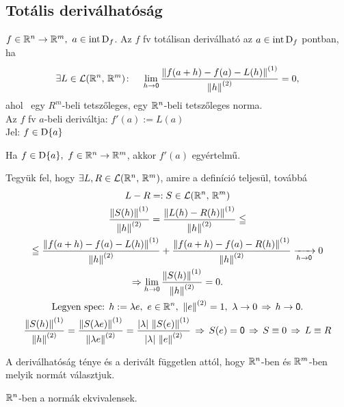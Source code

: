 \subsection{Totális deriválhatóság}

\begin{de}
  $f\in\mathbb{R}^n\to\mathbb{R}^m,\ a\in\operatorname{int\,D}_f$. Az $f$ fv totálisan deriválható az $a\in\operatorname{int\,D}_f$ pontban, ha
  \[\exists L\in\mathcal{L}(\mathbb{R}^n,\,\mathbb{R}^m)\colon\quad \lim_{h\to\mathsf{0}}\dfrac{\left\Vert f(a+h)-f(a)-L(h)\right\Vert^{(1)}}{\left\Vert h\right\Vert^{(2)}} = 0,\]
  ahol \ egy $R^m$-beli tetszőleges,  egy $\mathbb{R}^n$-beli tetszőleges norma.\\
  Az $f$ fv $a$-beli deriváltja: $f'(a) := L(a)$\\
  Jel: $f\in\operatorname{D}\{a\}$
\end{de}

\begin{te}
  Ha $f\in\operatorname{D}\{a\},\ f\in\mathbb{R}^n\to\mathbb{R}^m$, akkor $f'(a)$ egyértelmű.
\end{te}

\begin{biz}
  Tegyük fel, hogy $\exists L,R\in\mathcal{L}(\mathbb{R}^n,\,\mathbb{R}^m)$, amire a definíció teljesül, továbbá 
  \begin{gather*}
     L-R=:S\in\mathcal{L}(\mathbb{R}^n,\,\mathbb{R}^m)\\
     \dfrac{\left\Vert S(h)\right\Vert^{(1)}}{\left\Vert h\right\Vert^{(2)}} = \dfrac{\left\Vert L(h)-R(h)\right\Vert^{(1)}}{\left\Vert h\right\Vert^{(2)}} \leqq\\
     \leqq\dfrac{\left\Vert f(a+h)-f(a)-L(h)\right\Vert^{(1)}}{\left\Vert h\right\Vert^{(2)}} + \dfrac{\left\Vert f(a+h)-f(a)-R(h)\right\Vert^{(1)}}{\left\Vert h\right\Vert^{(2)}} \xrightarrow
     [h\to\mathsf{0}]{}0\\
     \Rightarrow \lim_{h\to\mathsf{0}} \dfrac{\left\Vert S(h)\right\Vert^{(1)}}{\left\Vert h\right\Vert^{(2)}} = 0.\\\text{Legyen spec: }h:=\lambda e,\
     e\in\mathbb{R}^n,\ \left\Vert e\right\Vert^{(2)} = 1,\ \lambda \to 0\, \Rightarrow\, h\to\mathsf{0}. \\
     \dfrac{\left\Vert S(h)\right\Vert^{(1)}}{\left\Vert h\right\Vert^{(2)}} = \dfrac{\left\Vert S(\lambda e)\right\Vert^{(1)}}{\left\Vert \lambda e \right\Vert^{(2)}} =
     \dfrac{|\lambda|\,\left\Vert S(e)\right\Vert^{(1)}}{|\lambda|\,\left\Vert e\right\Vert^{(2)}}\, \Rightarrow\, S(e) = \mathsf{0} \,\Rightarrow\, S \equiv 0 \,\Rightarrow\, L
     \equiv R
  \end{gather*}
\end{biz}

\begin{te}
  A deriválhatóság ténye és a derivált független attól, hogy $\mathbb{R}^n$-ben és $\mathbb{R}^m$-ben melyik normát választjuk.
\end{te}
\begin{biz}
  $\mathbb{R}^n$-ben a normák ekvivalensek.
\end{biz}

